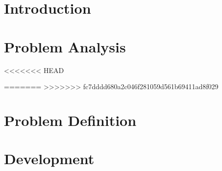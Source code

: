 




\sloppy
{}


\cleardoublepage

\date{\today}
\cleardoublepage

\tableofcontents

\cleardoublepage




\chapter{Introduction}\label{ch:introduction}





\chapter{Problem Analysis}\label{ch:problem_analysis}



<<<<<<< HEAD










=======
>>>>>>> fc7dddd680a2c046f281059d561b69411ad8f029


\clearpage
\chapter{Problem Definition}\label{ch:problem_definition}

%

%







\clearpage
\chapter{Development}\label{ch:development}

